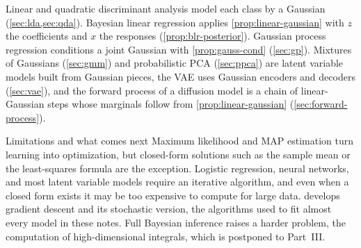 \begin{remark}\label{rem:gaussian-uses}
Linear and quadratic discriminant analysis model each class by a Gaussian (\cref{sec:lda,sec:qda}). Bayesian linear regression applies \cref{prop:linear-gaussian} with $z$ the coefficients and $x$ the responses (\cref{prop:blr-posterior}). Gaussian process regression conditions a joint Gaussian with \cref{prop:gauss-cond} (\cref{sec:gp}). Mixtures of Gaussians (\cref{sec:gmm}) and probabilistic PCA (\cref{sec:ppca}) are latent variable models built from Gaussian pieces, the VAE uses Gaussian encoders and decoders (\cref{sec:vae}), and the forward process of a diffusion model is a chain of linear-Gaussian steps whose marginals follow from \cref{prop:linear-gaussian} (\cref{sec:forward-process}).
\end{remark}

\begin{notebox}{Limitations and what comes next}
Maximum likelihood and MAP estimation turn learning into optimization, but closed-form solutions such as the sample mean or the least-squares formula are the exception. Logistic regression, neural networks, and most latent variable models require an iterative algorithm, and even when a closed form exists it may be too expensive to compute for large data.  develops gradient descent and its stochastic version, the algorithms used to fit almost every model in these notes. Full Bayesian inference raises a harder problem, the computation of high-dimensional integrals, which is postponed to Part~III.
\end{notebox}
